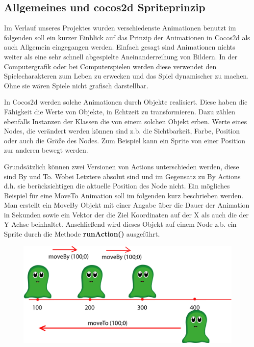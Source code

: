 \label{sec:2_Animationsprinzip}

\subsection{Allgemeines und cocos2d Spriteprinzip}
Im Verlauf unseres Projektes wurden verschiedenste Animationen benutzt im folgenden soll ein kurzer Einblick auf das Prinzip der Animationen in Cocos2d als auch Allgemein  eingegangen werden. Einfach gesagt sind Animationen nichts weiter als eine sehr schnell abgespielte Aneinanderreihung von Bildern. In der Computergrafik oder bei Computerspielen werden diese verwendet den Spielecharakteren zum Leben zu erwecken und das Spiel dynamischer zu machen. Ohne sie wären Spiele nicht grafisch darstellbar.

In Cocos2d werden solche Animationen durch  Objekte realisiert. Diese haben die Fähigkeit die Werte von  Objekte, in Echtzeit zu transformieren. Dazu zählen ebenfalls Instanzen der Klassen die von einem solchen Objekt erben. Werte eines Nodes, die verändert werden können sind z.b. die Sichtbarkeit, Farbe, Position oder auch die Größe des Nodes. Zum Beispiel kann ein Sprite von einer Position zur anderen bewegt werden.

Grundsätzlich können zwei Versionen von Actions unterschieden werden, diese sind By und To. Wobei Letztere absolut sind und im Gegensatz zu By Actions d.h. sie berücksichtigen die aktuelle Position des Node nicht. Ein mögliches Beispiel für eine MoveTo Animation soll im folgenden kurz beschrieben werden. Man erstellt ein MoveBy Objekt mit einer Angabe über die Dauer der Animation in Sekunden sowie ein Vektor der die Ziel Koordinaten auf der X als auch die der Y Achse beinhaltet. Anschließend wird dieses Objekt auf einem Node z.b. ein Sprite durch die Methode \textbf{runAction()} ausgeführt. 

\begin{figure}[H]
 \centering
  \includegraphics[width=12\textwidth]{resources/josiedoku6}
  \label{fig:josiemoveByTo} 
\end{figure}

